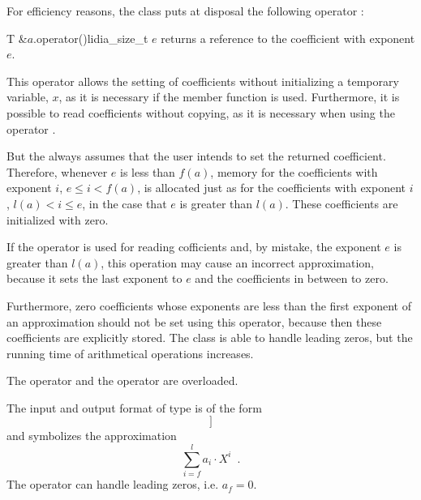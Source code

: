 For efficiency reasons, the class  puts at disposal the following
operator :

\begin{fcode}{T &}{$a$.operator()}{lidia_size_t $e$}
  returns a reference to the coefficient with exponent $e$.
  
  This operator allows the setting of coefficients without initializing a temporary variable,
  $x$, as it is necessary if the member function  is
  used.  Furthermore, it is possible to read coefficients without copying, as it is necessary
  when using the operator .
  
  But the  always assumes that the user intends to set the returned
  coefficient.  Therefore, whenever $e$ is less than $f(a)$, memory for the coefficients with
  exponent $i$, $e \leq i < f(a)$, is allocated just as for the coefficients with exponent $i$,
  $l(a) < i \leq e$, in the case that $e$ is greater than $l(a)$.  These coefficients are
  initialized with zero.

  \attentionI
  If the operator is used for reading cofficients and, by mistake, the exponent $e$ is greater
  than $l(a)$, this operation may cause an incorrect approximation, because it sets the last
  exponent to $e$ and the coefficients in between to zero.
  
  Furthermore, zero coefficients whose exponents are less than the first exponent of an
  approximation should not be set using this operator, because then these coefficients are
  explicitly stored.  The class  is able to handle leading zeros,
  but the running time of arithmetical operations increases.
\end{fcode}



\IO

The  operator \code{>>} and the  operator \code{<<} are overloaded.

The input and output format of type  is of the form
\begin{displaymath}
  [ f \; [ a_{f} \dots a_{l}] ]
\end{displaymath}
and symbolizes the approximation
\begin{displaymath}
  \sum_{i=f}^{l} a_{i} \cdot X^{i} \enspace.
\end{displaymath}
The operator\code{>>} can handle leading zeros, i.e. $a_{f} = 0$.

